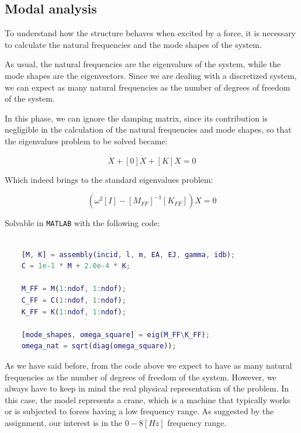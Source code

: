 \subsection{Modal analysis}
\label{sub:modal_analysis}

To understand how the structure behaves when excited by a force, it is necessary to calculate the natural frequencies and the mode shapes of the system.

As usual, the natural frequencies are the eigenvalues of the system, while the mode shapes are the eigenvectors.
Since we are dealing with a discretized system, we can expect as many natural frequencies as the number of degrees of freedom of the system.

In this phase, we can ignore the damping matrix, since its contribution is negligible in the calculation of the natural frequencies and mode shapes, so that the eigenvalues problem to be solved became:

\begin{equation}
    [M] \ddot{X} + [0] \dot{X} + [K] X = 0
\end{equation}

Which indeed brings to the standard eigenvalues problem:

\begin{equation}
    (\omega^2 [I] - [M_{FF}]^{-1} [K_{FF}]) X = 0
\end{equation}

Solvable in \texttt{MATLAB} with the following code:

\begin{lstlisting}[language=Matlab]

    [M, K] = assembly(incid, l, m, EA, EJ, gamma, idb);
    C = 1e-1 * M + 2.0e-4 * K;

    M_FF = M(1:ndof, 1:ndof);
    C_FF = C(1:ndof, 1:ndof);
    K_FF = K(1:ndof, 1:ndof);

    [mode_shapes, omega_square] = eig(M_FF\K_FF);
    omega_nat = sqrt(diag(omega_square));

\end{lstlisting}

As we have said before, from the code above we expect to have as many natural frequencies as the number of degrees of freedom of the system.
However, we always have to keep in mind the real physical representation of the problem.
In this case, the model represents a crane, which is a machine that typically works or is subjected to forces having a low frequency range.
As suggested by the assignment, our interest is in the $0-8 [Hz]$ frequency range.

